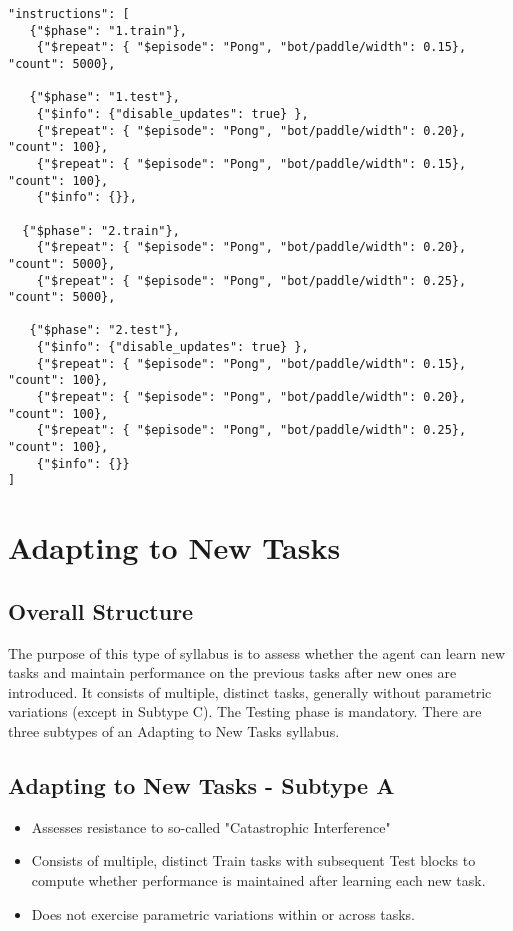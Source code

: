 \begin{small}
\begin{verbatim}
"instructions": [    
   {"$phase": "1.train"}, 
    {"$repeat": { "$episode": "Pong", "bot/paddle/width": 0.15}, "count": 5000}, 

   {"$phase": "1.test"},   
    {"$info": {"disable_updates": true} },
    {"$repeat": { "$episode": "Pong", "bot/paddle/width": 0.20}, "count": 100},  
    {"$repeat": { "$episode": "Pong", "bot/paddle/width": 0.15}, "count": 100},  
    {"$info": {}},
   
  {"$phase": "2.train"},  
    {"$repeat": { "$episode": "Pong", "bot/paddle/width": 0.20}, "count": 5000},
    {"$repeat": { "$episode": "Pong", "bot/paddle/width": 0.25}, "count": 5000},

   {"$phase": "2.test"},   
    {"$info": {"disable_updates": true} },
    {"$repeat": { "$episode": "Pong", "bot/paddle/width": 0.15}, "count": 100},
    {"$repeat": { "$episode": "Pong", "bot/paddle/width": 0.20}, "count": 100},  
    {"$repeat": { "$episode": "Pong", "bot/paddle/width": 0.25}, "count": 100},  
    {"$info": {}}
]
\end{verbatim}
\end{small}

\section{Adapting to New Tasks}
\subsection*{Overall Structure}

The purpose of this type of syllabus is to assess whether the agent can learn new tasks and maintain performance on the previous tasks after new ones are introduced. It consists of multiple, distinct tasks, generally without parametric variations (except in Subtype C). The Testing phase is mandatory. There are three subtypes of an Adapting to New Tasks syllabus.

\subsection*{Adapting to New Tasks - Subtype A}
\begin{itemize}
\item Assesses resistance to so-called "Catastrophic Interference"
\item Consists of multiple, distinct Train tasks with subsequent Test blocks to compute whether performance is maintained after learning each new task.
\item Does not exercise parametric variations within or across tasks.
\end{itemize}

